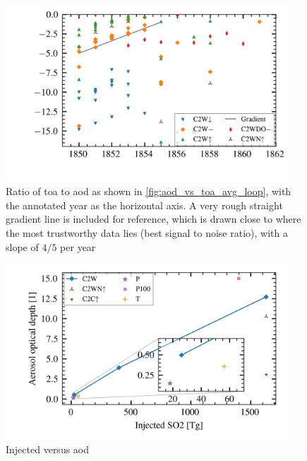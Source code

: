 \documentclass{ametsocV5}
\begin{document}
\begin{figure}
  \begin{center}
    \includegraphics[width=0.95\textwidth]{figures/aod_vs_toa_avg_loop_ratio.png}
  \end{center}
  \caption{
    Ratio of \acrshort{toa} to \acrshort{aod} as shown in
    \cref{fig:aod_vs_toa_avg_loop}, with the annotated year as the horizontal axis. A
    very rough straight gradient line is included for reference, which is drawn close to
    where the most trustworthy data lies (best signal to noise ratio), with a slope of
    \(4/5\) per year
  }
  \label{fig:aod_vs_toa_avg_loop_ratio}
\end{figure}

\begin{figure}
  \begin{center}
    \includegraphics[width=0.95\textwidth]{figures/injection_vs_aod.png}
  \end{center}
  \caption{Injected  versus \acrshort{aod}}
  \label{fig:so2_vs_aod}
\end{figure}
\end{document}
